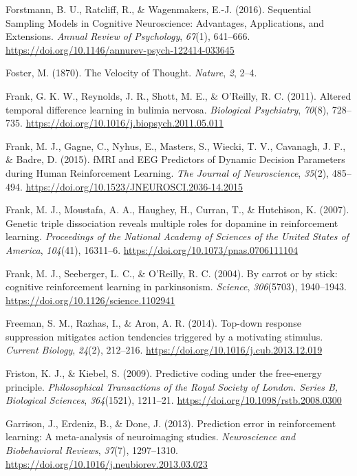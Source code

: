 \documentclass[12pt,openany]{book}
\theoremstyle{definition}
\theoremstyle{definition}
\theoremstyle{definition}
\theoremstyle{remark}
\begin{document}
\hypertarget{ref-Forstmann2016}{}
Forstmann, B. U., Ratcliff, R., \& Wagenmakers, E.-J. (2016). Sequential
Sampling Models in Cognitive Neuroscience: Advantages, Applications, and
Extensions. \emph{Annual Review of Psychology}, \emph{67}(1), 641--666.
\url{https://doi.org/10.1146/annurev-psych-122414-033645}

\hypertarget{ref-Foster1870}{}
Foster, M. (1870). The Velocity of Thought. \emph{Nature}, \emph{2},
2--4.

\hypertarget{ref-Frank2011}{}
Frank, G. K. W., Reynolds, J. R., Shott, M. E., \& O'Reilly, R. C.
(2011). Altered temporal difference learning in bulimia nervosa.
\emph{Biological Psychiatry}, \emph{70}(8), 728--735.
\url{https://doi.org/10.1016/j.biopsych.2011.05.011}

\hypertarget{ref-Frank2015}{}
Frank, M. J., Gagne, C., Nyhus, E., Masters, S., Wiecki, T. V.,
Cavanagh, J. F., \& Badre, D. (2015). fMRI and EEG Predictors of Dynamic
Decision Parameters during Human Reinforcement Learning. \emph{The
Journal of Neuroscience}, \emph{35}(2), 485--494.
\url{https://doi.org/10.1523/JNEUROSCI.2036-14.2015}

\hypertarget{ref-Frank2007a}{}
Frank, M. J., Moustafa, A. A., Haughey, H., Curran, T., \& Hutchison, K.
(2007). Genetic triple dissociation reveals multiple roles for dopamine
in reinforcement learning. \emph{Proceedings of the National Academy of
Sciences of the United States of America}, \emph{104}(41), 16311--6.
\url{https://doi.org/10.1073/pnas.0706111104}

\hypertarget{ref-Frank2004}{}
Frank, M. J., Seeberger, L. C., \& O'Reilly, R. C. (2004). By carrot or
by stick: cognitive reinforcement learning in parkinsonism.
\emph{Science}, \emph{306}(5703), 1940--1943.
\url{https://doi.org/10.1126/science.1102941}

\hypertarget{ref-Freeman2014}{}
Freeman, S. M., Razhas, I., \& Aron, A. R. (2014). Top-down response
suppression mitigates action tendencies triggered by a motivating
stimulus. \emph{Current Biology}, \emph{24}(2), 212--216.
\url{https://doi.org/10.1016/j.cub.2013.12.019}

\hypertarget{ref-Friston2009}{}
Friston, K. J., \& Kiebel, S. (2009). Predictive coding under the
free-energy principle. \emph{Philosophical Transactions of the Royal
Society of London. Series B, Biological Sciences}, \emph{364}(1521),
1211--21. \url{https://doi.org/10.1098/rstb.2008.0300}

\hypertarget{ref-Garrison2013}{}
Garrison, J., Erdeniz, B., \& Done, J. (2013). Prediction error in
reinforcement learning: A meta-analysis of neuroimaging studies.
\emph{Neuroscience and Biobehavioral Reviews}, \emph{37}(7), 1297--1310.
\url{https://doi.org/10.1016/j.neubiorev.2013.03.023}
\end{document}
